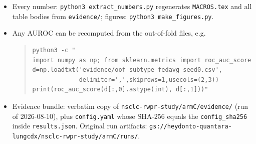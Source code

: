 \documentclass[11pt,a4paper]{article}
\begin{document}
\begin{itemize}[leftmargin=1.2em,itemsep=1pt]
\item Every number: \texttt{python3 extract\_numbers.py} regenerates \texttt{MACROS.tex} and
all table bodies from \texttt{evidence/}; figures: \texttt{python3 make\_figures.py}.
\item Any AUROC can be recomputed from the out-of-fold files, e.g.
\begin{quote}\small\begin{verbatim}
python3 -c "
import numpy as np; from sklearn.metrics import roc_auc_score
d=np.loadtxt('evidence/oof_subtype_fedavg_seed0.csv',
             delimiter=',',skiprows=1,usecols=(2,3))
print(roc_auc_score(d[:,0].astype(int), d[:,1]))"
\end{verbatim}\end{quote}
\item Evidence bundle: verbatim copy of \texttt{nsclc-rwpr-study/armC/evidence/} (run of
2026-08-10), plus \texttt{config.yaml} whose SHA-256 equals the \texttt{config\_sha256} inside
\texttt{results.json}. Original run artifacts:
\texttt{gs://heydonto-quantara-lungcdx/nsclc-rwpr-study/armC/runs/}.
\end{itemize}
\end{document}
